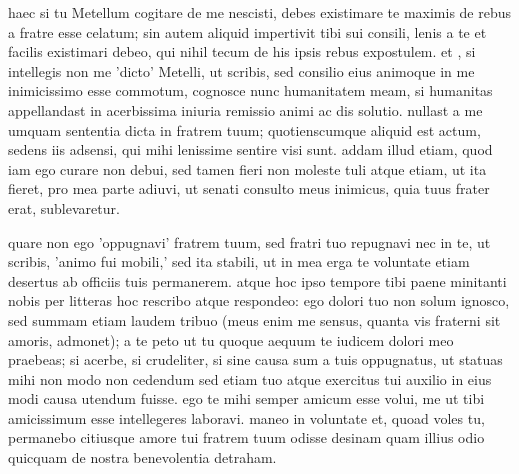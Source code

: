  haec si tu Metellum cogitare de me nescisti, debes existimare te maximis de rebus a fratre esse celatum; sin autem aliquid impertivit tibi sui consili, lenis a te et facilis existimari debeo, qui nihil tecum de his ipsis rebus expostulem. et , si intellegis non me 'dicto' Metelli, ut scribis, sed consilio eius animoque in me inimicissimo esse commotum, cognosce nunc humanitatem meam, si humanitas appellandast in acerbissima iniuria remissio animi ac dis solutio. nullast a me umquam sententia dicta in fratrem tuum; quotienscumque aliquid est actum, sedens iis adsensi, qui mihi lenissime sentire visi sunt. addam illud etiam, quod iam ego curare non debui, sed tamen fieri non moleste tuli atque etiam, ut ita fieret, pro mea parte adiuvi, ut senati consulto meus inimicus, quia tuus frater erat, sublevaretur.

 quare non ego 'oppugnavi' fratrem tuum, sed fratri tuo repugnavi nec in te, ut scribis, 'animo fui mobili,' sed ita stabili, ut in mea erga te voluntate etiam desertus ab officiis tuis permanerem. atque hoc ipso tempore tibi paene minitanti nobis per litteras hoc rescribo atque respondeo: ego dolori tuo non solum ignosco, sed summam etiam laudem tribuo (meus enim me sensus, quanta vis fraterni sit amoris, admonet); a te peto ut tu quoque aequum te iudicem dolori meo praebeas; si acerbe, si crudeliter, si sine causa sum a tuis oppugnatus, ut statuas mihi non modo non cedendum sed etiam tuo atque exercitus tui auxilio in eius modi causa utendum fuisse. ego te mihi semper amicum esse volui, me ut tibi amicissimum esse intellegeres laboravi. maneo in voluntate et, quoad voles tu, permanebo citiusque amore tui fratrem tuum odisse desinam quam illius odio quicquam de nostra benevolentia detraham.
